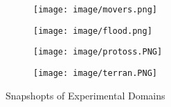 
\begin{figure*}[t]
\newcommand\gapa{0.175}
\newcommand\gapb{0.25}
\newcommand\subgap{1.}
  \begin{subfigure}[b]{\gapa\linewidth}
      \centering
      \texttt{[image: image/movers.png]}
      \caption{\movers}
      \label{fig: movers}
  \end{subfigure}
  \hfill 
  \begin{subfigure}[b]{\gapa\linewidth}
      \centering
      \texttt{[image: image/flood.png]}
      \caption{\rescue}
      \label{fig: flood}
  \end{subfigure}
  \hfill  
  \begin{subfigure}[b]{\gapb\linewidth}
      \centering
      \texttt{[image: image/protoss.PNG]}
      \caption{\protoss}
      \label{fig: protoss}
  \end{subfigure}
  \hfill  
  \begin{subfigure}[b]{\gapb\linewidth}
      \centering
      \texttt{[image: image/terran.PNG]}
      \caption{\terran}
      \label{fig: terran}
  \end{subfigure}

  \captionsetup{subrefformat=parens}
  \caption{Snapshopts of Experimental Domains}
  \label{fig: domains}
\end{figure*}
